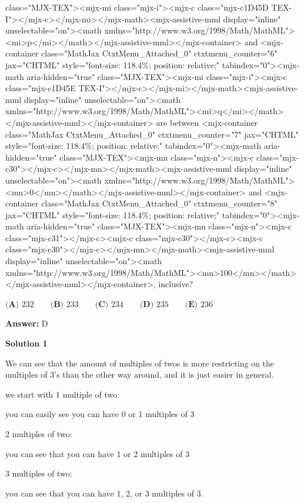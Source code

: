 \begin{enumerate}
class="MJX-TEX"><mjx-mi class="mjx-i"><mjx-c class="mjx-c1D45D TEX-I"></mjx-c></mjx-mi></mjx-math><mjx-assistive-mml display="inline" unselectable="on"><math xmlns="http://www.w3.org/1998/Math/MathML"><mi>p</mi></math></mjx-assistive-mml></mjx-container> and <mjx-container class="MathJax CtxtMenu\_Attached\_0" ctxtmenu\_counter="6" jax="CHTML" style="font-size: 118.4\%; position: relative;" tabindex="0"><mjx-math aria-hidden="true" class="MJX-TEX"><mjx-mi class="mjx-i"><mjx-c class="mjx-c1D45E TEX-I"></mjx-c></mjx-mi></mjx-math><mjx-assistive-mml display="inline" unselectable="on"><math xmlns="http://www.w3.org/1998/Math/MathML"><mi>q</mi></math></mjx-assistive-mml></mjx-container> are between <mjx-container class="MathJax CtxtMenu\_Attached\_0" ctxtmenu\_counter="7" jax="CHTML" style="font-size: 118.4\%; position: relative;" tabindex="0"><mjx-math aria-hidden="true" class="MJX-TEX"><mjx-mn class="mjx-n"><mjx-c class="mjx-c30"></mjx-c></mjx-mn></mjx-math><mjx-assistive-mml display="inline" unselectable="on"><math xmlns="http://www.w3.org/1998/Math/MathML"><mn>0</mn></math></mjx-assistive-mml></mjx-container> and <mjx-container class="MathJax CtxtMenu\_Attached\_0" ctxtmenu\_counter="8" jax="CHTML" style="font-size: 118.4\%; position: relative;" tabindex="0"><mjx-math aria-hidden="true" class="MJX-TEX"><mjx-mn class="mjx-n"><mjx-c class="mjx-c31"></mjx-c><mjx-c class="mjx-c30"></mjx-c><mjx-c class="mjx-c30"></mjx-c></mjx-mn></mjx-math><mjx-assistive-mml display="inline" unselectable="on"><math xmlns="http://www.w3.org/1998/Math/MathML"><mn>100</mn></math></mjx-assistive-mml></mjx-container>, inclusive?


 $\textbf{(A) } 232\qquad\textbf{(B) }233\qquad\textbf{(C) }234\qquad\textbf{(D) }235\qquad\textbf{(E) }236$

 \textbf{Answer: }D



\textbf{Solution 1}

We can see that the amount of multiples of twos is more restricting on the multiples of 3's than the other way around, and it is just easier in general.

 we start with 1 multiple of two:

 you can easily see you can have 0 or 1 multiples of 3 

 2 multiples of two:

 you can see that you can have 1 or 2 multiples of 3

 3 multiples of two:

 you can see that you can have 1, 2, or 3 multiples of 3.


\end{enumerate}
